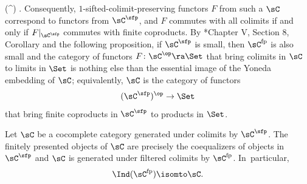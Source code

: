 \be \label{sInd-all}
(\sC^\sfp) \isomto \sC.
\ee
Consequently, $1$-sifted-colimit-preserving functors $F$ from such a $\sC$ correspond %
to functors from $\sC^{\sfp}$, and $F$ commutes with all colimits if and only if $F|_{\sC^{\sfp}}$ commutes with finite coproducts. By \cite{Mac98}*{Chapter V, Section 8, Corollary} and the following proposition, %
if $\sC^\sfp$ is small, then $\sC^{\mathrm{fp}}$ is also small and the category of functors $F \colon \sC^\op \ra \Set$ that bring colimits in $\sC$ to limits in $\Set$ is nothing else than the essential image of the Yoneda embedding of $\sC$; equivalently, $\sC$ is the category of functors
\[
(\sC^\sfp)^\op\to \Set
\]
that bring finite coproducts in $\sC^\sfp$ to products in $\Set$. %
\epp


\begin{proposition}
\notready
Let $\sC$ be a cocomplete category generated under colimits by $\sC^\sfp$. The finitely presented objects of $\sC$  are precisely the coequalizers  of objects in $\sC^\sfp$ and
$\sC$ is generated under filtered colimits by $\sC^{\mathrm{fp}}$. In~particular,
\[
\Ind(\sC^{\mathrm{fp}})\isomto \sC.
\]
\end{proposition}



